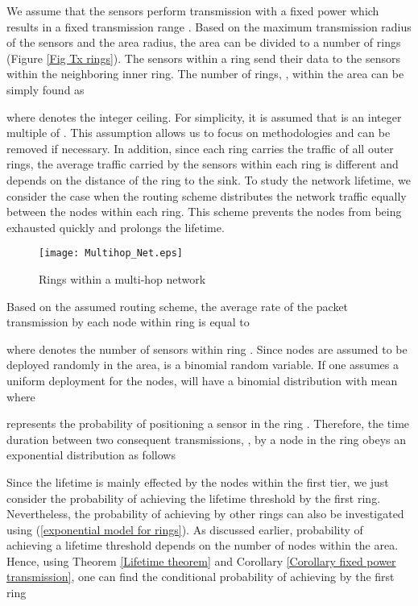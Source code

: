 \documentclass[conference]{IEEEtran}
\begin{document}
We assume that the sensors perform transmission with a fixed power
which results in a fixed transmission range . Based on the
maximum transmission radius of the sensors and the area radius, the
area can be divided to a number of rings (Figure \ref{Fig Tx
rings}). The sensors within a ring send their data to the sensors
within the neighboring inner ring. The number of rings, , within
the area can be simply found as

where  denotes the integer ceiling. For
simplicity, it is assumed that  is an integer multiple of .
This assumption allows us to focus on methodologies and can be
removed if necessary. In addition, since each ring carries the
traffic of all outer rings, the average traffic carried by the
sensors within each ring is different and depends on the distance of
the ring to the sink. To study the network lifetime, we consider the
case when the routing scheme distributes the network traffic equally
between the nodes within each ring. This scheme prevents the nodes
from being exhausted quickly and prolongs the lifetime.

\begin{figure}[!h]
\centering
\texttt{[image: Multihop\_Net.eps]}
\caption{Rings within a multi-hop network} \label{Fig Tx rings}
\end{figure}

Based on the assumed routing scheme, the average rate of the packet
transmission by each node within ring  is equal to

where  denotes the number of sensors within ring . Since
nodes are assumed to be deployed randomly in the area,  is a
binomial random variable. If one assumes a uniform deployment for
the nodes,  will have a binomial distribution with mean 
where

represents the probability of positioning a sensor in the ring .
Therefore, the time duration between two consequent transmissions,
, by a node in the ring  obeys an exponential distribution as
follows

Since the lifetime is mainly effected by the nodes within the first
tier, we just consider the probability of achieving the lifetime
threshold by the first ring. Nevertheless, the probability of
achieving  by other rings can also be investigated using
(\ref{exponential model for rings}). As discussed earlier,
probability of achieving a lifetime threshold depends on the number
of nodes within the area. Hence, using Theorem \ref{Lifetime
theorem} and Corollary \ref{Corollary fixed power transmission}, one
can find the conditional probability of achieving  by the
first ring
\end{document}
